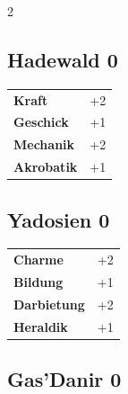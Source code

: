 \begin{multicols}{2}
\begin{tcolorbox}

\end{tcolorbox}

\begin{tcolorbox}
    \subsection*{Hadewald \hfill \small{0 }}
    \tcblower




\begin{tabular}{@{}ll@{}}
    \textbf{Kraft} & +2\\
    \textbf{Geschick} & +1\\
    \textbf{Mechanik} & +2\\
    \textbf{Akrobatik} & +1\\
\end{tabular}


\end{tcolorbox}

\begin{tcolorbox}
    \subsection*{Yadosien \hfill \small{0 }}
    \tcblower




\begin{tabular}{@{}ll@{}}
    \textbf{Charme} & +2\\
    \textbf{Bildung} & +1\\
    \textbf{Darbietung} & +2\\
    \textbf{Heraldik} & +1\\
\end{tabular}


\end{tcolorbox}

\begin{tcolorbox}
    \subsection*{Gas'Danir \hfill \small{0 }}
    \tcblower





\end{tcolorbox}
\end{multicols}

